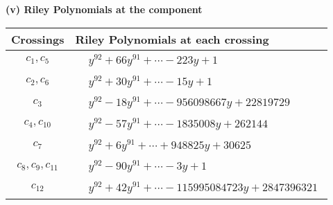 \documentclass[1p]{elsarticle_modified}
\theoremstyle{definition}
\begin{document}
\newpage\renewcommand{\arraystretch}{1}
\flushleft \textbf{(v) Riley Polynomials at the component}\newline \\
\begin{tabular}{m{50pt}|m{274pt}}
Crossings & \hspace{64pt}Riley Polynomials at each crossing \\
\hline $$\begin{aligned}c_{1},c_{5}\end{aligned}$$&$\begin{aligned}
&y^{92}+66 y^{91}+\cdots-223 y+1
\end{aligned}$\\
\hline $$\begin{aligned}c_{2},c_{6}\end{aligned}$$&$\begin{aligned}
&y^{92}+30 y^{91}+\cdots-15 y+1
\end{aligned}$\\
\hline $$\begin{aligned}c_{3}\end{aligned}$$&$\begin{aligned}
&y^{92}-18 y^{91}+\cdots-956098667 y+22819729
\end{aligned}$\\
\hline $$\begin{aligned}c_{4},c_{10}\end{aligned}$$&$\begin{aligned}
&y^{92}-57 y^{91}+\cdots-1835008 y+262144
\end{aligned}$\\
\hline $$\begin{aligned}c_{7}\end{aligned}$$&$\begin{aligned}
&y^{92}+6 y^{91}+\cdots+948825 y+30625
\end{aligned}$\\
\hline $$\begin{aligned}c_{8},c_{9},c_{11}\end{aligned}$$&$\begin{aligned}
&y^{92}-90 y^{91}+\cdots-3 y+1
\end{aligned}$\\
\hline $$\begin{aligned}c_{12}\end{aligned}$$&$\begin{aligned}
&y^{92}+42 y^{91}+\cdots-115995084723 y+2847396321
\end{aligned}$\\
\hline
\end{tabular}\\~\\
\end{document}
